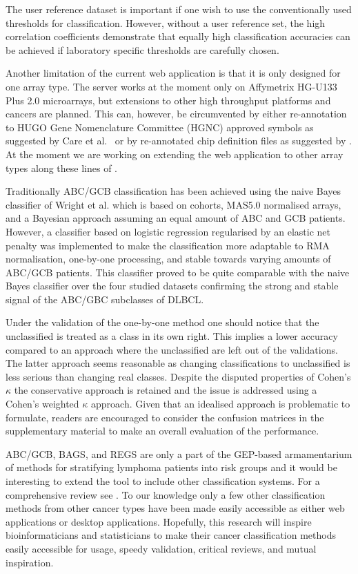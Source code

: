 \documentclass[twocolumn]{bmcart}%
\begin{document}
The user reference dataset is important if one wish to use the conventionally used thresholds for classification.
However, without a user reference set, the high correlation coefficients demonstrate that equally high classification accuracies can be achieved if laboratory specific thresholds are carefully chosen.

Another limitation of the current web application is that it is only designed for one array type.
The server works at the moment only on Affymetrix HG-U133 Plus 2.0 microarrays, but extensions to other high throughput platforms and cancers are planned.
This can, however, be circumvented by either re-annotation to HUGO Gene Nomenclature Committee (HGNC) approved symbols as suggested by Care et al.~\cite{Care2013} or by re-annotated chip definition files as suggested by \cite{Dai2005}.
At the moment we are working on extending the web application to other array types along these lines of \cite{Dai2005}.

Traditionally ABC/GCB classification has been achieved using the naive Bayes classifier of Wright et al.\cite{Wright2003} which is based on cohorts, MAS5.0 normalised arrays, and a Bayesian approach assuming an equal amount of ABC and GCB patients.
However, a classifier based on logistic regression regularised by an elastic net penalty was implemented to make the classification more adaptable to RMA normalisation, one-by-one processing, and stable towards varying amounts of ABC/GCB patients.
This classifier proved to be quite comparable with the naive Bayes classifier over the four studied datasets confirming the strong and stable signal of the ABC/GBC subclasses of DLBCL.

Under the validation of the one-by-one method one should notice that the unclassified is treated as a class in its own right.
This implies a lower accuracy compared to an approach where the unclassified are left out of the validations.
The latter approach seems reasonable as changing classifications to unclassified is less serious than changing real classes.
Despite the disputed properties of Cohen's $\kappa$ the conservative approach is retained and the issue is addressed using a Cohen's weighted $\kappa$ approach.
Given that an idealised approach is problematic to formulate, readers are encouraged to consider the confusion matrices in the supplementary material to make an overall evaluation of the performance.

ABC/GCB, BAGS, and REGS are only a part of the GEP-based armamentarium of methods for stratifying lymphoma patients into risk groups \cite{Shipp2002, Lossos2004a, Malumbres2008} and it would be interesting to extend the tool to include other classification systems.
For a comprehensive review see \cite{Coutinho2013}.
To our knowledge only a few other classification methods from other cancer types have been made easily accessible as either web applications or desktop applications.
Hopefully, this research will inspire bioinformaticians and statisticians to make their cancer classification methods easily accessible for usage, speedy validation, critical reviews, and mutual inspiration.
\end{document}
